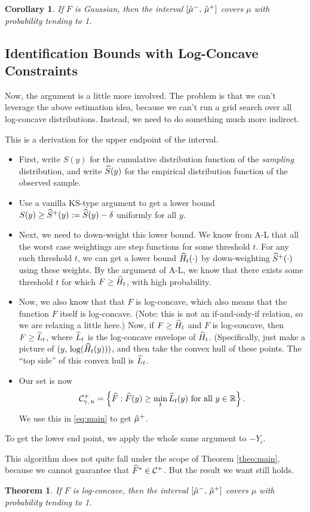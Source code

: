\documentclass{article}
\theoremstyle{plain}
\newtheorem{coro}[prop]{Corollary}
\newtheorem{theo}[prop]{Theorem}
\theoremstyle{definition}
\theoremstyle{remark}
\begin{document}
\begin{coro}
If $F$ is Gaussian, then the interval $[\hat{\mu}^-, \, \hat{\mu}^+]$ covers $\mu$ with probability tending to 1.
\end{coro}

\subsection{Identification Bounds with Log-Concave Constraints}

Now, the argument is a little more involved. The problem is that we can't leverage
the above estimation idea, because we can't run a grid search over all log-concave
distributions. Instead, we need to do something much more indirect.

This is a derivation for the upper endpoint of the interval.
\begin{itemize}
\item First, write $S(y)$ for the cumulative distribution function of the
\emph{sampling} distribution, and write $\widehat{S}(y)$ for the empirical distribution
function of the observed sample.
\item Use a vanilla KS-type argument to get a lower bound $S(y) \geq \widehat{S}^+(y) := \widehat{S}(y) - \delta$
uniformly for all $y$.
\item Next, we need to down-weight this lower bound. We know from A-L that all the
worst case weightings are step functions for some threshold $t$. For any such threshold
$t$, we can get a lower bound $\widehat{H}_t(\cdot)$ by down-weighting $\widehat{S}^+(\cdot)$ using
these weights. By the argument of A-L, we know that there exists some threshold $t$
for which $F \geq \widehat{H}_t$, with high probability.
\item Now, we also know that that $F$ is log-concave, which also means that the function
$F$ itself is log-concave. (Note: this is not an if-and-only-if relation, so we are relaxing
a little here.) Now, if $F \geq \widehat{H}_t$ and $F$ is log-concave, then $F \geq \widehat{L}_t$,
where $\widehat{L}_t$ is the log-concave envelope of $\widehat{H}_t$. (Specifically, just make a picture
of $(y, \, \log(\widehat{H}_t(y)))$, and then take the convex hull of these points. The ``top side''
of this convex hull is $\widehat{L}_t$.
\item Our set is now
$$ \mathcal{C}^+_{\gamma, \, n} = \left\{\widehat{F} : \widehat{F}(y) \geq \min_t \widehat{L}_t(y) \text{ for all } y \in \mathbb{R}\right\}. $$
We use this in \eqref{eq:main} to get $\hat{\mu}^+$.
\end{itemize}
To get the lower end point, we apply the whole same argument to $-Y_i$.

This algorithm does not quite fall under the scope of Theorem \ref{theo:main}, because we
cannot guarantee that $\widehat{F}^* \in \mathcal{C}^+$. But the result we want still holds.

\begin{theo}
If $F$ is log-concave, then the interval $[\hat{\mu}^-, \, \hat{\mu}^+]$ covers $\mu$ with probability tending to 1.
\end{theo}
\end{document}
